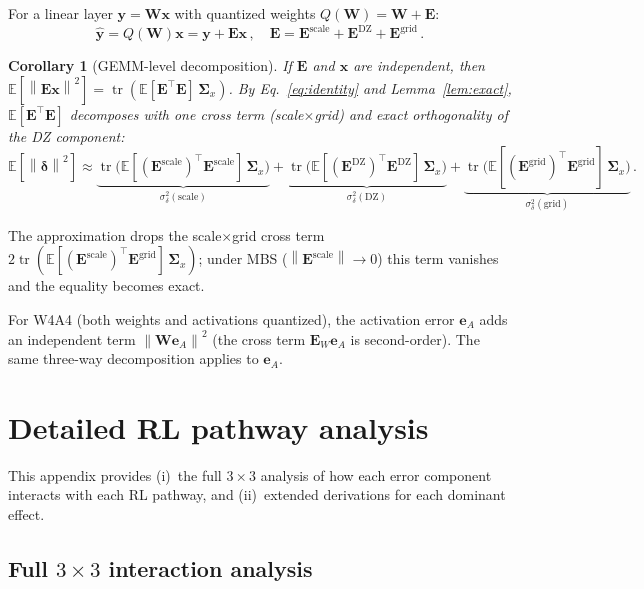 \documentclass{article}
\newtheorem{corollary}[theorem]{Corollary}
\theoremstyle{definition}
\theoremstyle{remark}
\DeclareMathOperator{\tr}{tr}
\newcommand{\Expect}{\mathbb{E}}
\newcommand{\bx}{\bm{x}}
\newcommand{\by}{\bm{y}}
\newcommand{\be}{\bm{e}}
\newcommand{\bE}{\bm{E}}
\newcommand{\bW}{\bm{W}}
\newcommand{\bdelta}{\bm{\delta}}
\newcommand{\bSigma}{\bm{\Sigma}}
\newcommand{\norm}[1]{\left\|#1\right\|}
\begin{document}
For a linear layer $\by = \bW\bx$ with quantized weights $Q(\bW) = \bW + \bE$:
\begin{equation}
  \hat{\by} = Q(\bW)\bx = \by + \bE\bx\,,
  \quad \bE = \bE^{\mathrm{scale}} + \bE^{\mathrm{DZ}} + \bE^{\mathrm{grid}}\,.
\end{equation}

\begin{corollary}[GEMM-level decomposition]
\label{cor:gemm}
If $\bE$ and $\bx$ are independent, then $\Expect[\norm{\bE\bx}^2] = \tr(\Expect[\bE^\top\bE]\,\bSigma_x)$. By Eq.~\ref{eq:identity} and Lemma~\ref{lem:exact}, $\Expect[\bE^\top\bE]$ decomposes with one cross term (scale$\times$grid) and exact orthogonality of the DZ component:
\begin{equation}
  \Expect[\norm{\bdelta}^2]
  \approx
  \underbrace{\tr\!\bigl(\Expect[(\bE^{\mathrm{scale}})^\top\bE^{\mathrm{scale}}]\,\bSigma_x\bigr)}_{\sigma_\delta^2(\mathrm{scale})}
  + \underbrace{\tr\!\bigl(\Expect[(\bE^{\mathrm{DZ}})^\top\bE^{\mathrm{DZ}}]\,\bSigma_x\bigr)}_{\sigma_\delta^2(\mathrm{DZ})}
  + \underbrace{\tr\!\bigl(\Expect[(\bE^{\mathrm{grid}})^\top\bE^{\mathrm{grid}}]\,\bSigma_x\bigr)}_{\sigma_\delta^2(\mathrm{grid})}\,.
\end{equation}
\end{corollary}

The approximation drops the scale$\times$grid cross term $2\tr(\Expect[(\bE^{\mathrm{scale}})^\top\bE^{\mathrm{grid}}]\,\bSigma_x)$; under MBS ($\norm{\bE^{\mathrm{scale}}} \to 0$) this term vanishes and the equality becomes exact.

For W4A4 (both weights and activations quantized), the activation error $\be_A$ adds an independent term $\norm{\bW\be_A}^2$ (the cross term $\bE_W\be_A$ is second-order). The same three-way decomposition applies to $\be_A$.


\section{Detailed RL pathway analysis}
\label{app:pathway_details}

This appendix provides (i)~the full $3 \times 3$ analysis of how each error component interacts with each RL pathway, and (ii)~extended derivations for each dominant effect.

\subsection{Full $3 \times 3$ interaction analysis}
\label{app:full_matrix}
\end{document}
